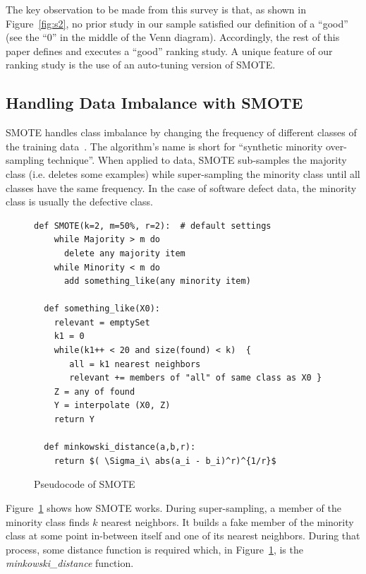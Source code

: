 \documentclass[10pt,conference]{IEEEtran}
\theoremstyle{break}
\theoremstyle{break}
\begin{document}
The key   observation to be made from  this 
survey is that, as shown in Figure~\ref{fig:s2}, no prior study in our sample satisfied  our definition of a ``good'' (see the ``0'' in the middle of the Venn diagram).
Accordingly, the rest of this
paper defines and executes a ``good'' ranking  study. A unique feature of our
ranking study is the use of an auto-tuning version of SMOTE.
 
 
\subsection{Handling Data Imbalance with SMOTE}
\label{sect:smote}

SMOTE handles class imbalance by changing the frequency of different classes of the training
data~\cite{chawla2002smote}. 
The algorithm's name is short for ``synthetic minority over-sampling technique''.
When applied to data, SMOTE sub-samples the majority class (i.e. deletes some examples)
while super-sampling the minority class
until
all classes have the same frequency.  In the case of software defect data,
the minority class is usually the  defective class.



\begin{figure}[!htbp]
\scriptsize
\begin{lstlisting}[mathescape,linewidth=8.2cm,frame=r,numbers=right]
  def SMOTE(k=2, m=50%, r=2):  # default settings
    while Majority > m do
      delete any majority item
    while Minority < m do
      add something_like(any minority item)
      
  def something_like(X0): 
    relevant = emptySet
    k1 = 0
    while(k1++ < 20 and size(found) < k)  {
       all = k1 nearest neighbors
       relevant += members of "all" of same class as X0 }
    Z = any of found
    Y = interpolate (X0, Z)
    return Y
    
  def minkowski_distance(a,b,r): 
    return $( \Sigma_i\ abs(a_i - b_i)^r)^{1/r}$
\end{lstlisting}
\caption{Pseudocode of SMOTE}
\label{fig:pseudocode}  
\end{figure}



Figure~\ref{fig:pseudocode} shows how SMOTE works. During super-sampling,
a member of the minority class finds $k$ nearest neighbors. It builds a fake member
of the minority class at some point in-between itself and one of its nearest
neighbors.  During that process, some distance function is required which, in Figure~\ref{fig:pseudocode}, is the {\em minkowski\_distance} function. 
\end{document}
